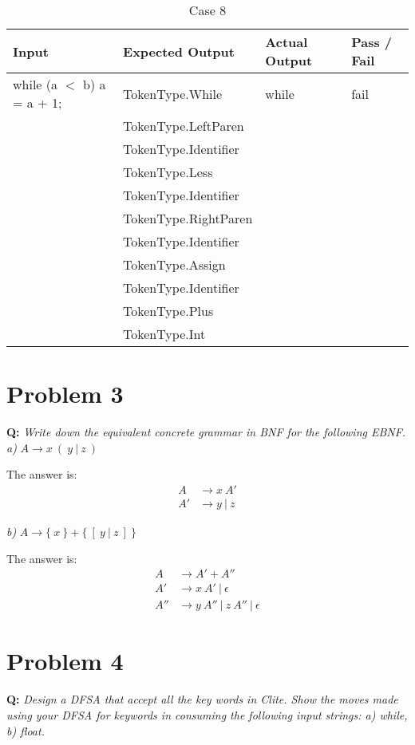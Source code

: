 \documentclass{article}
\begin{document}
\begin{table}[hp]
\begin{center}
\begin{tabular}{|l|l|l|l|}
\hline
Input & Expected Output & Actual Output & Pass / Fail \\
\hline
while (a $<$ b) a = a + 1; & TokenType.While & while & fail \\
 & TokenType.LeftParen & & \\
 & TokenType.Identifier & & \\
 & TokenType.Less & & \\
 & TokenType.Identifier & & \\
 & TokenType.RightParen & & \\
 & TokenType.Identifier & & \\
 & TokenType.Assign & & \\
 & TokenType.Identifier & & \\
 & TokenType.Plus & & \\
 & TokenType.Int & & \\
\hline
\end{tabular}
\end{center}
\caption{Case 8}
\end{table}

\section*{Problem 3}
\textbf{Q:} \textit{Write down the equivalent concrete grammar in BNF for the following EBNF.}\\

\textit{a)} $A \rightarrow x\ (\ y\ |\ z\ )$

The answer is:
\begin{align*}
A &\rightarrow x\ A' \\
A' &\rightarrow y\ |\ z
\end{align*}

\textit{b)} $A \rightarrow \{\ x\ \}+\{\ [\ y\ |\ z\ ]\ \}$

The answer is:
\begin{align*}
A &\rightarrow A'+A'' \\
A' &\rightarrow x\ A'\ |\ \epsilon \\
A'' &\rightarrow y\ A''\ |\ z\ A''\ |\ \epsilon
\end{align*}

\section*{Problem 4}
\textbf{Q:} \textit{Design a DFSA that accept all the key words in Clite. Show the moves made using your DFSA for keywords in consuming the following input strings: a) while, b) float.}
\end{document}

